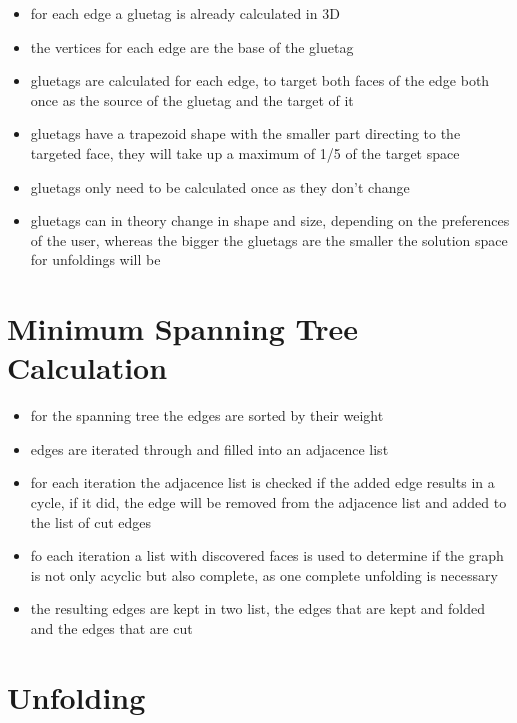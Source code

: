 \documentclass[draft,final]{vutinfth} %
\begin{document}
\begin{itemize}
	\item for each edge a gluetag is already calculated in 3D
	\item the vertices for each edge are the base of the gluetag
	\item gluetags are calculated for each edge, to target both faces of the edge both once as the source of the gluetag and the target of it
	\item gluetags have a trapezoid shape with the smaller part directing to the targeted face, they will take up a maximum of 1/5 of the target space
	\item gluetags only need to be calculated once as they don't change
	\item gluetags can in theory change in shape and size, depending on the preferences of the user, whereas the bigger the gluetags are the smaller the solution space for unfoldings will be
\end{itemize}

\section{Minimum Spanning Tree Calculation}

\begin{itemize}
	\item for the spanning tree the edges are sorted by their weight
	\item edges are iterated through and filled into an adjacence list
	\item for each iteration the adjacence list is checked if the added edge results in a cycle, if it did, the edge will be removed from the adjacence list and added to the list of cut edges
	\item fo each iteration a list with discovered faces is used to determine if the graph is not only acyclic but also complete, as one complete unfolding is necessary
	\item the resulting edges are kept in two list, the edges that are kept and folded and the edges that are cut
\end{itemize}

\section{Unfolding}
\end{document}
